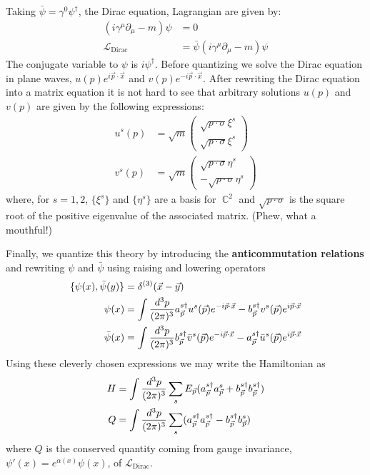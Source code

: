 \documentclass{report}
\theoremstyle{plain}
\theoremstyle{definition}
\theoremstyle{remark}
\newcommand{\FR}[2]{\frac{#1}{#2}}
\newcommand{\mc}{\mathcal}
\newcommand{\gam}{\gamma}
\newcommand{\sg}{\sigma}
\newcommand{\di}{\partial}
\newcommand{\ha} { a}
\newcommand{\hb} { b}
\DeclareMathOperator{\bC}{\mathbb{C}}
\begin{document}
Taking $\bar\psi = \gam^0\psi^\dag$, the Dirac equation, Lagrangian are
given by:
\begin{align*}
    (i\gam^\mu\di_\mu - m)\psi &= 0\\
    \mc L_{\text{Dirac}} &= \bar\psi(i\gam^\mu\di_\mu-m)\psi
\end{align*}
The conjugate variable to $\psi$ is $i\psi^\dag$. Before quantizing we
solve the Dirac equation in plane waves, $u(p)e^{i\vec p\cdot
\vec x}$ and $v(p)e^{-i\vec p\cdot \vec x}$. After rewriting the Dirac
equation into a matrix equation it is not hard to see that arbitrary
solutions $u(p)$ and $v(p)$ are given by the following expressions:
\begin{align*}
    u^s(p) &= \sqrt{m}\begin{pmatrix} \sqrt{p\cdot \sg} \xi^s\\
                      \sqrt{p\cdot \sg} \xi^s\end{pmatrix}\\
    v^s(p) &= \sqrt{m}\begin{pmatrix} \sqrt{p\cdot \sg} \eta^s\\
                      -\sqrt{p\cdot \sg} \eta^s\end{pmatrix}
\end{align*}
where, for $s=1,2$, $\{\xi^s\}$ and $\{\eta^s\}$ are a basis for $\bC^2$
and $\sqrt{p\cdot \sg}$ is the square root of the positive eigenvalue of
the associated matrix. (Phew, what a mouthful!)


Finally, we quantize this theory by introducing the \textbf{anticommutation
relations} and rewriting $\psi$ and $\bar\psi$ using raising and lowering
operators
\begin{align*} 
\{\psi(x),\bar\psi(y)\} &= \delta^{(3)}(\vec x-\vec y)\\
\psi(x) &= \int \FR{d^3p}{(2\pi)^3} 
\ha^{s\dag}_\vp u^s(\vp) e^{-i\vp\cdot\vx} -
\hb^{s\dag}_\vp v^s(\vp) e^{i\vp\cdot\vx} \\
\bar\psi(x) &= \int \FR{d^3p}{(2\pi)^3} 
\hb^{s\dag}_\vp \bar v^s(\vp) e^{-i\vp\cdot\vx} -
\ha^{s\dag}_\vp \bar u^s(\vp) e^{i\vp\cdot\vx}
\end{align*}
Using these cleverly chosen expressions we may write the Hamiltonian as
\begin{align*}
    H &= \int \FR{d^3p}{(2\pi)^3}  \sum_s
    E_\vp(\ha^{s\dag}_\vp\ha^{s}_\vp+ \hb^{s\dag}_\vp\hb^{s\dag}_\vp)\\
    Q &= \int \FR{d^3p}{(2\pi)^3}  \sum_s
    (\ha^{s\dag}_\vp\ha^{s\dag}_\vp - \hb^{s\dag}_\vp\hb^{s}_\vp)
\end{align*}
where $Q$ is the conserved quantity coming from gauge invariance,
$\psi'(x)=e^{\alpha(x)}\psi(x)$, of $\mc L_{\text{Dirac}}$.
\end{document}
